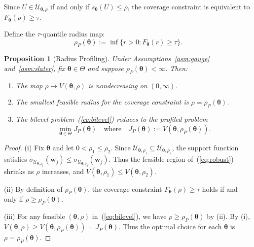 \documentclass[lettersize,journal]{IEEEtran}
\newcommand{\cU}{\mathcal{U}}
\newcommand{\btheta}{\bm{\theta}}
\newcommand{\bw}{\bm{w}}
\newtheorem{proposition}[theorem]{Proposition}
\theoremstyle{definition}
\begin{document}
Since $U \in \cU_{\btheta,\rho}$ if and only if $s_{\btheta}(U) \leq \rho$, the coverage constraint is equivalent to $F_{\btheta}(\rho) \geq \tau$.

Define the $\tau$-quantile radius map:
\begin{equation}\label{eq:rhoP}
\rho_P(\btheta) := \inf\{r > 0 : F_{\btheta}(r) \geq \tau\}.
\end{equation}

\begin{proposition}[Radius Profiling]\label{prop:profiling}
Under Assumptions~\ref{asm:gauge} and~\ref{asm:slater}, fix $\btheta \in \Theta$ and suppose $\rho_P(\btheta) < \infty$. Then:
\begin{enumerate}
\item The map $\rho \mapsto V(\btheta, \rho)$ is nondecreasing on $(0,\infty)$.
\item The smallest feasible radius for the coverage constraint is $\rho = \rho_P(\btheta)$.
\item The bilevel problem~(\ref{eq:bilevel}) reduces to the profiled problem
\begin{equation}\label{eq:profiled}
\min_{\btheta \in \Theta} J_P(\btheta) \quad \text{where} \quad J_P(\btheta) := V(\btheta, \rho_P(\btheta)).
\end{equation}
\end{enumerate}
\end{proposition}

\begin{proof}
(i) Fix $\btheta$ and let $0 < \rho_1 \leq \rho_2$. Since $\cU_{\btheta,\rho_1} \subseteq \cU_{\btheta,\rho_2}$, the support function satisfies $\sigma_{\cU_{\btheta,\rho_1}}(\bw_j) \leq \sigma_{\cU_{\btheta,\rho_2}}(\bw_j)$. Thus the feasible region of~(\ref{eq:robust}) shrinks as $\rho$ increases, and $V(\btheta,\rho_1) \leq V(\btheta,\rho_2)$.

(ii) By definition of $\rho_P(\btheta)$, the coverage constraint $F_{\btheta}(\rho) \geq \tau$ holds if and only if $\rho \geq \rho_P(\btheta)$.

(iii) For any feasible $(\btheta, \rho)$ in~(\ref{eq:bilevel}), we have $\rho \geq \rho_P(\btheta)$ by (ii). By (i), $V(\btheta,\rho) \geq V(\btheta,\rho_P(\btheta)) = J_P(\btheta)$. Thus the optimal choice for each $\btheta$ is $\rho = \rho_P(\btheta)$.
\end{proof}

\end{document}
